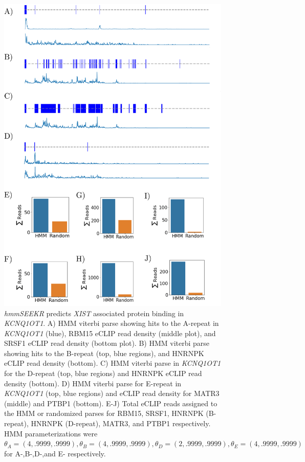 \begin{figure}[h!]
\centering
\includegraphics[width=.89\textwidth]{images/kcneclip.pdf}
\caption[Analysis of HMM and eCLIP data in \emph{KCNQ1OT1}]{\emph{hmmSEEKR} predicts \emph{XIST} associated protein binding in \emph{KCNQ1OT1}. A) HMM viterbi parse showing hits to the A-repeat in \emph{KCNQ1OT1} (blue), RBM15 eCLIP read density (middle plot), and SRSF1 eCLIP read density (bottom plot). B) HMM viterbi parse showing hits to the B-repeat (top, blue regions), and HNRNPK eCLIP read density (bottom). C) HMM viterbi parse in \emph{KCNQ1OT1} for the D-repeat (top, blue regions) and HNRNPK eCLIP read density (bottom). D) HMM viterbi parse for E-repeat in \emph{KCNQ1OT1} (top, blue regions) and eCLIP read density for MATR3 (middle) and PTBP1 (bottom). E-J) Total eCLIP reads assigned to the HMM or randomized parses for RBM15, SRSF1, HNRNPK (B-repeat), HNRNPK (D-repeat), MATR3, and PTBP1 respectively. HMM parameterizations were $\theta_A = (4,.9999,.9999), \theta_B = (4,.9999,.9999), \theta_D = (2,.9999,.9999), \theta_E = (4,.9999,.9999)$ for A-,B-,D-,and E- respectively. }
\label{fig:kcntracks}
\end{figure}

